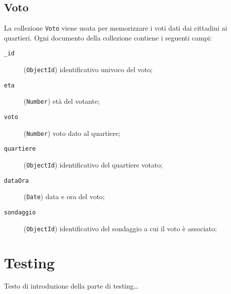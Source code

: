     \subsection{Voto}
        La collezione \texttt{Voto} viene usata per memorizzare i voti dati dai cittadini ai quartieri. Ogni documento della collezione contiene i seguenti campi:
        \begin{description}
            \item[\texttt{\_id}] (\texttt{ObjectId}) identificativo univoco del voto;
            \item[\texttt{eta}] (\texttt{Number}) età del votante;
            \item[\texttt{voto}] (\texttt{Number}) voto dato al quartiere;
            \item[\texttt{quartiere}] (\texttt{ObjectId}) identificativo del quartiere votato;
            \item[\texttt{dataOra}] (\texttt{Date}) data e ora del voto;
            \item[\texttt{sondaggio}] (\texttt{ObjectId}) identificativo del sondaggio a cui il voto è associato;
        \end{description}
\section{Testing}

Testo di introduzione della parte di testing\dots

